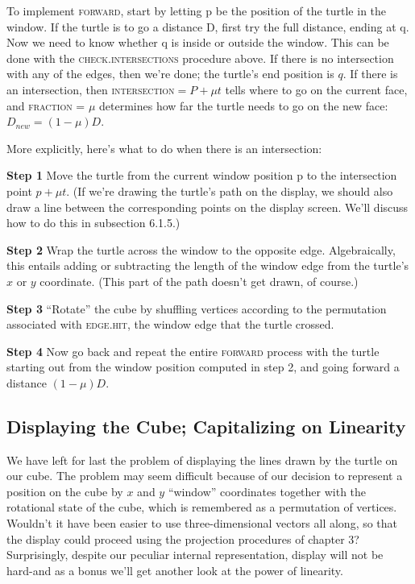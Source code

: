 \documentclass{book}
\begin{document}
To implement \textsc{forward}, start by letting p be the position of the turtle
in the window. If the turtle is to go a distance D, first try the full
distance, ending at q. Now we need to know whether q is inside or
outside the window. This can be done with the \textsc{check}\textsc{.intersections}
procedure above. If there is no intersection with any of the edges, then
we're done; the turtle's end position is $q$. If there is an intersection,
then \textsc{intersection}$ = P + \mu t$ tells where to go on the current face, and
\textsc{fraction} = $\mu$ determines how far the turtle needs to go on the new
face: $D_{new} = (1 - \mu)D$.

More explicitly, here's what to do when there is an intersection:

\textbf{Step 1} Move the turtle from the current window position p to the
intersection point $p + \mu t$. (If we're drawing the turtle's path on the
display, we should also draw a line between the corresponding points on
the display screen. We'll discuss how to do this in subsection 6.1.5.)

\textbf{Step 2} Wrap the turtle across the window to the opposite edge. Algebraically, this entails adding or subtracting the length of the window
edge from the turtle's $x$ or $y$ coordinate. (This part of the path doesn't
get drawn, of course.)

\textbf{Step 3} ``Rotate'' the cube by shuffling vertices according to the permutation associated with \textsc{edge}\textsc{.hit}, the window edge that the turtle crossed.

\textbf{Step 4} Now go back and repeat the entire \textsc{forward} process with the
turtle starting out from the window position computed in step 2, and
going forward a distance $(1 - \mu)D$.

\subsection{Displaying the Cube; Capitalizing on Linearity}

We have left for last the problem of displaying the lines drawn by
the turtle on our cube. The problem may seem difficult because of
our decision to represent a position on the cube by $x$ and $y$ ``window''
coordinates together with the rotational state of the cube, which is
remembered as a permutation of vertices. Wouldn't it have been easier to
use three-dimensional vectors all along, so that the display could proceed
using the projection procedures of chapter 3? Surprisingly, despite our
peculiar internal representation, display will not be hard-and as a bonus
we'll get another look at the power of linearity.
\end{document}
